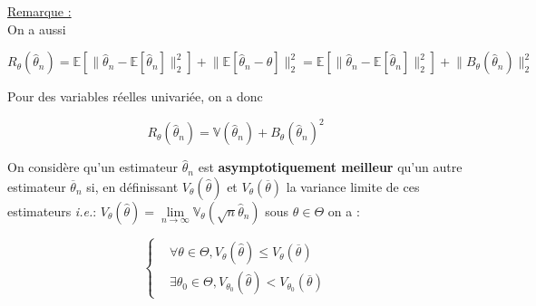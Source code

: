 \documentclass[12pt]{article}
\newif\ifcorrection
\newcommand{\corr}[1]{\ifcorrection{\color{lightblue}#1\color{black}}\fi}
\newcommand{\espace}{\vspace{1.5em}}
\newcommand{\petitespace}{\vspace{0.5cm}}
\newcommand{\bb}[1]{\mathbb{#1}} %
\newcommand{\ie}{\textit{i.e.}}
\newcommand{\Rq}{\underline{Remarque :} \\}
\newcommand{\esp}[1]{\bb{ E} \mathopen{}\left[#1\right]} %
\newcommand{\Var}[1]{\bb{ V} \mathopen{}\left(#1\right)} %
\newcommand{\1}{\bb{1}} %
\newcommand{\accogauche}{
    \left\{
    \begin{aligned}
}
\newcommand{\finaccogauche}{
    \end{aligned}
    \right.
}
\begin{document}
\Rq

On a aussi

$$R_\theta(\widehat \theta_n) = \esp{\lVert\widehat \theta_n-\esp{\widehat \theta_n}\rVert_2^2} + \lVert\esp{\widehat \theta_n-\theta}\rVert_2^2=  \esp{\lVert\widehat \theta_n-\esp{\widehat \theta_n}\rVert_2^2} + \lVert B_\theta(\widehat \theta_n)\rVert^2_2 $$
\petitespace

\corr{\textbf{Preuve :}\vspace{-1cm}

\begin{align*}
	R_\theta(\widehat \theta_n) &= \esp{\lVert \widehat \theta_n-\theta\rVert_2^2} \\
	&=  \esp{\lVert \widehat \theta_n-\esp{\widehat \theta_n} + \esp{\widehat \theta_n}-\theta\rVert_2^2}\\
	&= \esp{\lVert\widehat \theta_n-\esp{\widehat \theta_n}\rVert_2^2} +2\esp{(\widehat \theta_n-\esp{\widehat \theta_n})^T( \esp{\widehat \theta_n}-\theta)}+\esp{\lVert\esp{\widehat \theta_n}-\theta\rVert_2^2}\\
	&=  \esp{\lVert\widehat \theta_n-\esp{\widehat \theta_n}\rVert_2^2} +2(\esp{\widehat \theta_n}-\theta)(\esp{\widehat \theta_n}-\esp{\widehat \theta_n})^T +\lVert\esp{\widehat \theta_n-\theta}\rVert_2^2\\
	&=\esp{\lVert\widehat \theta_n-\esp{\widehat \theta_n}\rVert_2^2} + \lVert\esp{\widehat \theta_n-\theta}\rVert_2^2\\
	&=\esp{\lVert\widehat \theta_n-\esp{\widehat \theta_n}\rVert_2^2} + \lVert B_\theta(\widehat \theta_n)\rVert^2_2 
\end{align*}

}

Pour des variables réelles univariée, on a donc 

$$R_\theta(\widehat \theta_n) = \Var{\widehat \theta_n} + B_\theta(\widehat \theta_n)^2$$

\espace

On considère qu'un estimateur $\widehat \theta_n$ est \textbf{asymptotiquement meilleur} qu'un autre estimateur $\overline \theta_n$ si, en définissant $ V_\theta(\widehat \theta)$ et $ V_\theta(\overline \theta)$ la variance limite de ces estimateurs \ie : $V_\theta(\widehat \theta) = \lim\limits_{n \to \infty}\bb V_\theta(\sqrt n \widehat \theta_n)$ sous $\theta \in \Theta$ on a :

 $$\accogauche
&\forall \theta \in \Theta, V_\theta(\widehat \theta) \le  V_\theta(\overline \theta)    \\
& \exists \theta_0\in \Theta, V_{\theta_0}(\widehat \theta) <  V_{\theta_0}(\overline \theta)
\finaccogauche$$
\end{document}
